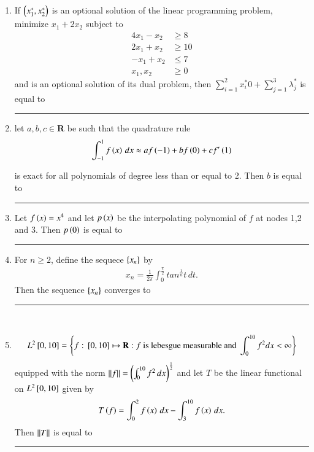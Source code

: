 \documentclass[journal]{IEEEtran}
\numberwithin{equation}{enumi}
\numberwithin{figure}{enumi}
\begin{document}
	\begin{enumerate}
		\item 
		If $\left(x_1^*, x_2^*\right)$ is an optional solution of the linear programming problem, minimize $x_1 + 2x_2$ subject to 
		\begin{align*}
			4x_1 - x_2 & \geq 8\\
			2x_1 + x_2 & \geq 10\\
			-x_1 + x_2 & \leq 7\\
			x_1, x_2 & \geq 0
		\end{align*}
		and  is an optional solution of its dual problem, then $\sum_{i = 1}^2 x_i^*0 + \sum_{j = 1}^3 \lambda_j^*$ is equal to \rule{2cm}{0.1pt} 
		
		\hfill{}

		\item 
		let $a, b, c \in \mathbf{R}$ be such that the quadrature rule 
		\begin{align*}
			\int_{-1}^1 f\left(x\right)\, dx \approx af\left(-1\right) + bf\left(0\right) + cf^\prime\left(1\right) 
		\end{align*}

		is exact for all polynomials of degree less than or equal to 2. Then $b$ is equal to \rule{2cm}{0.1pt} 
		
		\hfill{}

		\item 
		Let $f\left(x\right) = x^4$ and let $p\left(x\right)$ be the interpolating polynomial of $f$ at nodes 1,2 and 3. Then $p\left(0\right)$ is equal to \rule{2cm}{0.1pt}
		
		\hfill{}

		\item
		For $n \geq 2$, define the sequece $\left\{x_n\right\}$ by 
		\begin{align*} 
			x_n = \frac{1}{2\pi}\int_0^{\frac{\pi}{2}} tan^{\frac{1}{n}}{t}\, dt. 
		\end{align*}
		Then the sequence $\left\{x_n\right\}$ converges to \rule{2cm}{0.1pt}\\ 
		
		\hfill{}

		\item 
		\begin{align*}
			L^2{}\left[0,10\right] = \left\{f:{}\left[0,10\right]\mapsto \mathbf{R}: f \text{ is lebesgue measurable and }\int_0^{10}f^2dx < \infty\right\}
		\end{align*}
		equipped with the norm $\left\lVert f\right\rVert = \left(\int_0^{10} f^2\, dx\right)^{\frac{1}{2}}$ and let $T$ be the linear functional on $L^2{}\left[0,10\right]$ given by 
		\begin{align*}
			T\left(f\right) = \int_0^2 f\left(x\right)\, dx - \int_3^{10} f\left(x\right)\, dx.
		\end{align*}
		Then $\left\lVert T\right\rVert$ is equal to \rule{2cm}{0.1pt}
		

\end{enumerate}
\end{document}
